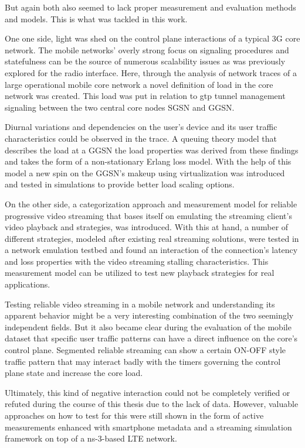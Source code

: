 But again both also seemed to lack proper measurement and evaluation methods and models. This is what was tackled in this work.

One one side, light was shed on the control plane interactions of a typical \gls{3G} core network. The mobile networks' overly strong focus on signaling procedures and statefulness can be the source of numerous scalability issues as was previously explored for the radio interface. Here, through the analysis of network traces of a large operational mobile core network a novel definition of load in the core network was created. This load was put in relation to \gls{gtp} tunnel management signaling between the two central core nodes \gls{SGSN} and \gls{GGSN}. 

Diurnal variations and dependencies on the user's device and its user traffic characteristics could be observed in the trace. A queuing theory model that describes the load at a \gls{GGSN} the load properties was derived from these findings and takes the form of a non-stationary Erlang loss model. With the help of this model a new spin on the \gls{GGSN}'s makeup using virtualization was introduced and tested in simulations to provide better load scaling options.

On the other side, a categorization approach and measurement model for reliable progressive video streaming that bases itself on emulating the streaming client's video playback and strategies, was introduced. With this at hand, a number of different strategies, modeled after existing real streaming solutions, were tested in a network emulation testbed and found an interaction of the connection's latency and loss properties with the video streaming stalling characteristics. This measurement model can be utilized to test new playback strategies for real applications.

Testing reliable video streaming in a mobile network and understanding its apparent behavior might be a very interesting combination of the two seemingly independent fields. But it also became clear during the evaluation of the mobile dataset that specific user traffic patterns can have a direct influence on the core's control plane. Segmented reliable streaming can show a certain ON-OFF style traffic pattern that may interact badly with the timers governing the control plane state and increase the core load.

Ultimately, this kind of negative interaction could not be completely verified or refuted during the course of this thesis due to the lack of data. However, valuable approaches on how to test for this were still shown in the form of active measurements enhanced with smartphone metadata and a streaming simulation framework on top of a ns-3-based \gls{LTE} network.

